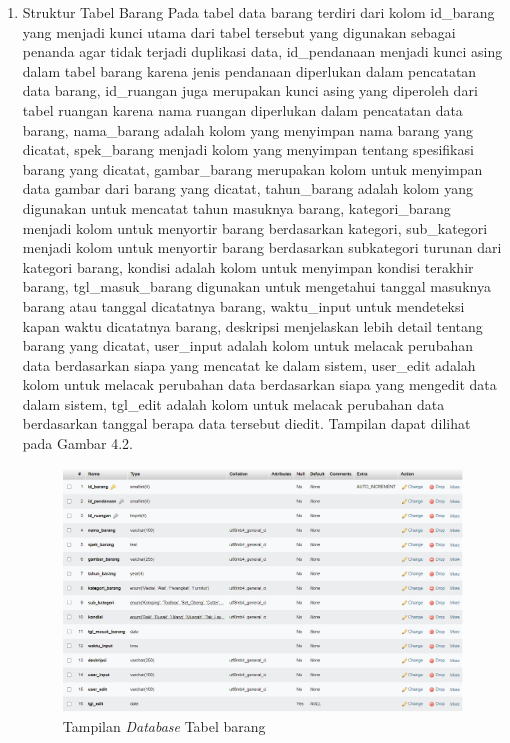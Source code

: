 \begin{enumerate}
  \item Struktur Tabel Barang
        Pada tabel data barang terdiri dari kolom id\_barang yang menjadi kunci utama dari tabel tersebut yang digunakan sebagai penanda agar tidak terjadi duplikasi data, id\_pendanaan menjadi kunci asing dalam tabel barang karena jenis pendanaan diperlukan dalam pencatatan data barang, id\_ruangan juga merupakan kunci asing yang diperoleh dari tabel ruangan karena nama ruangan diperlukan dalam pencatatan data barang, nama\_barang adalah kolom yang menyimpan nama barang yang dicatat, spek\_barang menjadi kolom yang menyimpan tentang spesifikasi barang yang dicatat, gambar\_barang merupakan kolom untuk menyimpan data gambar dari barang yang dicatat, tahun\_barang adalah kolom yang digunakan untuk mencatat tahun masuknya barang, kategori\_barang menjadi kolom untuk menyortir barang berdasarkan kategori, sub\_kategori menjadi kolom untuk menyortir barang berdasarkan subkategori turunan dari kategori barang, kondisi adalah kolom untuk menyimpan kondisi terakhir barang, tgl\_masuk\_barang digunakan untuk mengetahui tanggal masuknya barang atau tanggal dicatatnya barang, waktu\_input untuk mendeteksi kapan waktu dicatatnya barang, deskripsi menjelaskan lebih detail tentang barang yang dicatat, user\_input adalah kolom untuk melacak perubahan data berdasarkan siapa yang mencatat ke dalam sistem, user\_edit adalah kolom untuk melacak perubahan data berdasarkan siapa yang mengedit data dalam sistem, tgl\_edit adalah kolom untuk melacak perubahan data berdasarkan tanggal berapa data tersebut diedit. Tampilan dapat dilihat pada Gambar 4.2.

        \begin{figure}
          \centering
          \includegraphics[width=0.82\linewidth]{konten//gambar/Tampilan database tabel barang.png}
          \caption{Tampilan \textit{Database} Tabel barang}
          \label{fig:enter-label}
        \end{figure}


\end{enumerate}
